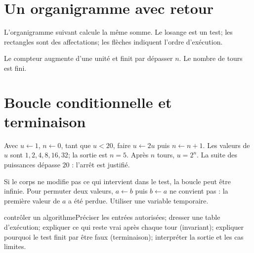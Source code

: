 \section{Un organigramme avec retour}
L’organigramme suivant calcule la même somme. Le losange est un test; les rectangles sont des affectations; les flèches indiquent l’ordre d’exécution.
\begin{visualisation}
\begin{center}\end{center}
Le compteur augmente d’une unité et finit par dépasser $n$. Le nombre de tours est fini.
\end{visualisation}
\section{Boucle conditionnelle et terminaison}
\begin{exemple}
Avec $u\leftarrow1$, $n\leftarrow0$, tant que $u<20$, faire $u\leftarrow2u$ puis $n\leftarrow n+1$. Les valeurs de $u$ sont $1,2,4,8,16,32$; la sortie est $n=5$. Après $n$ tours, $u=2^n$. La suite des puissances dépasse $20$ : l’arrêt est justifié.
\end{exemple}
\begin{avertissement}Si le corps ne modifie pas ce qui intervient dans le test, la boucle peut être infinie. Pour permuter deux valeurs, $a\leftarrow b$ puis $b\leftarrow a$ ne convient pas : la première valeur de $a$ a été perdue. Utiliser une variable temporaire.\end{avertissement}
\begin{methode}{contrôler un algorithme}Préciser les entrées autorisées; dresser une table d’exécution; expliquer ce qui reste vrai après chaque tour (invariant); expliquer pourquoi le test finit par être faux (terminaison); interpréter la sortie et les cas limites.\end{methode}

